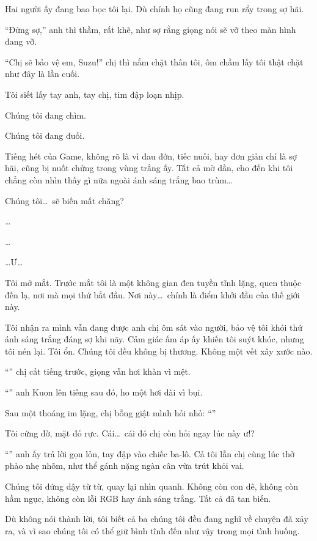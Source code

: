 \documentclass[../main.tex]{subfiles}
\begin{document}
Hai người ấy đang bao bọc tôi lại. Dù chính họ cũng đang run rẩy trong sợ hãi.

``Đừng sợ,'' anh thì thầm, rất khẽ, như sợ rằng giọng nói sẽ vỡ theo màn hình đang vỡ.

``Chị sẽ bảo vệ em, Suzu!'' chị thì nắm chặt thân tôi, ôm chầm lấy tôi thật chặt như đây là lần cuối.

Tôi siết lấy tay anh, tay chị, tim đập loạn nhịp.

Chúng tôi đang chìm.

Chúng tôi đang đuối.

Tiếng hét của Game, không rõ là vì đau đớn, tiếc nuối, hay đơn giản chỉ là sợ hãi, cũng bị nuốt chửng trong vùng trắng ấy. Tất cả mờ dần, cho đến khi tôi chẳng còn nhìn thấy gì nữa ngoài ánh sáng trắng bao trùm\dots

Chúng tôi\dots\ sẽ biến mất chăng?

\ct

\dots

\dots

\dots Ư\dots

Tôi mở mắt. Trước mắt tôi là một không gian đen tuyền tĩnh lặng, quen thuộc đến lạ, nơi mà mọi thứ bắt đầu. Nơi này\dots\ chính là điểm khởi đầu của thế giới này.


Tôi nhận ra mình vẫn đang được anh chị ôm sát vào người, bảo vệ tôi khỏi thứ ánh sáng trắng đáng sợ khi nãy. Cảm giác ấm áp ấy khiến tôi suýt khóc, nhưng tôi nén lại. Tôi ổn. Chúng tôi đều không bị thương. Không một vết xây xước nào.

``'' chị cất tiếng trước, giọng vẫn hơi khàn vì mệt.

``'' anh Kuon lên tiếng sau đó, ho một hơi dài vì bụi.

Sau một thoáng im lặng, chị bỗng giật mình hỏi nhỏ: ``''

Tôi cứng đờ, mặt đỏ rực. Cái\dots\ cái đó chị còn hỏi ngay lúc này ư!?

``'' anh ấy trả lời gọn lỏn, tay đập vào chiếc ba-lô. Cả tôi lẫn chị cùng lúc thở phào nhẹ nhõm, như thể gánh nặng ngàn cân vừa trút khỏi vai.

Chúng tôi đứng dậy từ từ, quay lại nhìn quanh. Không còn con dê, không còn hầm ngục, không còn lỗi RGB hay ánh sáng trắng. Tất cả đã tan biến.

Dù không nói thành lời, tôi biết cả ba chúng tôi đều đang nghĩ về chuyện đã xảy ra, và vì sao chúng tôi có thể giữ bình tĩnh đến như vậy trong mọi tình huống.
\end{document}
